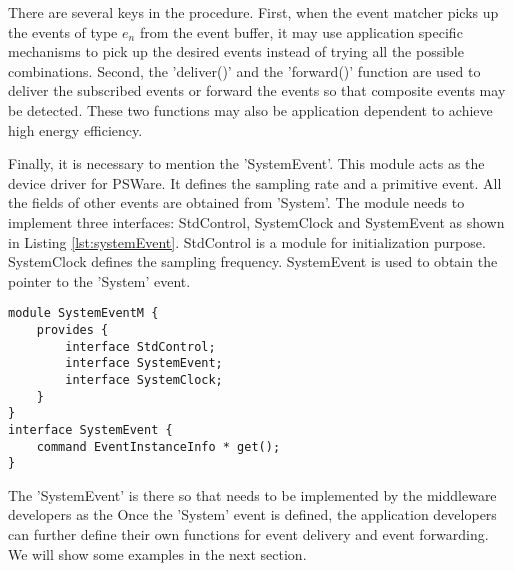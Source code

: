 \begin{enumerate}
{There are several keys in the procedure. First, when the event matcher picks up the events of type \(e_n\) from the event buffer, it may use application specific mechanisms to pick up the desired events instead of trying all the possible combinations. Second, the 'deliver()' and the 'forward()' function are used to deliver the subscribed events or forward the events so that composite events may be detected. These two functions may also be application dependent to achieve high energy efficiency.

\begin{comment}
Figure \ref{fig:psware-interaction-simple} illustrates how different components in the middleware system interact with each other.

\begin{figure}
\centering
\figurecurrentwidth{psware-interaction-simple}
\caption{PSWare-E components interaction}
\label{fig:psware-interaction-simple}
\end{figure}
\subsection{PSWare Customization}
\end{comment}

Finally, it is necessary to mention the 'SystemEvent'. This module acts as the device driver for PSWare. It defines the sampling rate and a primitive event. All the fields of other events are obtained from 'System'. The module needs to implement three interfaces: StdControl, SystemClock and SystemEvent as shown in Listing \ref{lst:systemEvent}. StdControl is a module for initialization purpose. SystemClock defines the sampling frequency. SystemEvent is used to obtain the pointer to the 'System' event.

\begin{lstlisting}[caption=API of the 'System' event, label=lst:systemEvent]
module SystemEventM {
	provides {
		interface StdControl;
		interface SystemEvent;
		interface SystemClock;
	}
}
interface SystemEvent {
	command EventInstanceInfo * get();
}
\end{lstlisting}

The 'SystemEvent' is there so that needs to be implemented by the middleware developers as the  Once the 'System' event is defined, the application developers can further define their own functions for event delivery and event forwarding. We will show some examples in the next section.

}
\end{enumerate}
